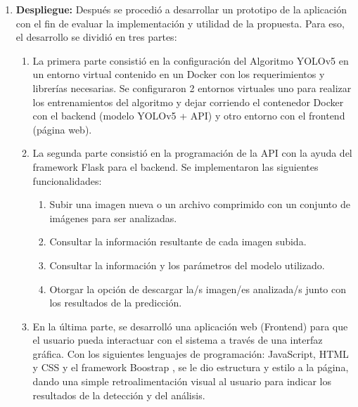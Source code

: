 \begin{enumerate}
    \item \textbf{Despliegue:} Después se procedió a desarrollar un prototipo de la aplicación con el fin de evaluar la implementación y utilidad de la propuesta. Para eso, el desarrollo se dividió en tres partes:
    \begin{enumerate}
        \item La primera parte consistió en la configuración del Algoritmo YOLOv5 en un entorno virtual contenido en un Docker con los requerimientos y librerías necesarias. Se configuraron 2 entornos virtuales uno para realizar los entrenamientos del algoritmo y dejar corriendo el contenedor Docker con el backend (modelo YOLOv5 + API) y otro entorno con el frontend (página web).
        \item La segunda parte consistió en la programación de la API con la ayuda del framework Flask \cite{flask} para el backend. Se implementaron las siguientes funcionalidades:
        \begin{enumerate}
            \item Subir una imagen nueva o un archivo comprimido con un conjunto de imágenes para ser analizadas.
            \item Consultar la información resultante de cada imagen subida.
            \item Consultar la información y los parámetros del modelo utilizado.
            \item Otorgar la opción de descargar la/s imagen/es analizada/s junto con los resultados de la predicción.
        \end{enumerate}
        \item En la última parte, se desarrolló una aplicación web (Frontend) para que el usuario pueda interactuar con el sistema a través de una interfaz gráfica. Con los siguientes lenguajes de programación: JavaScript, HTML y CSS y el framework Boostrap \cite{bootstrap}, se le dio estructura y estilo a la página, dando una simple retroalimentación visual al usuario para indicar los resultados de la detección y del análisis.
    \end{enumerate}
\end{enumerate}
\newpage
